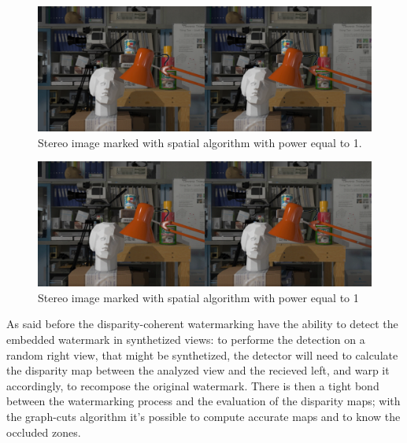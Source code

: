 \begin{figure}[h!]
\centering
\includegraphics[width=1\textwidth]{./img/marked_1_gauss.png}
\caption{\small{Stereo image marked with spatial algorithm with power equal to 1.}}
\label{fig:gauss1}
\end{figure}
\begin{figure}[h!]
\centering
\includegraphics[width=1\textwidth]{./img/marked_3_gauss.png}
\caption{\small{Stereo image marked with spatial algorithm with power equal to 1}}
\label{fig:gauss3}
\end{figure}
  
As said before the disparity-coherent watermarking have the ability to detect the embedded watermark in synthetized views: to performe the detection on a random right view, that might be synthetized, the detector will need to calculate the disparity map between the analyzed view and the recieved left, and warp it accordingly, to recompose the original watermark.\newline 
There is then a tight bond between the watermarking process and the evaluation of the disparity maps; with the graph-cuts algorithm it's possible to compute accurate maps and to know the occluded zones.
